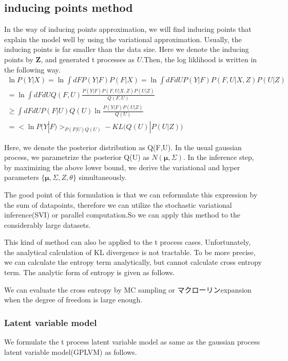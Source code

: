 \documentclass{article}
\begin{document}
 \subsection{inducing points method}

In the way of inducing points approximation, we will find inducing points that explain the model well by using the variational approximation. Usually, the inducing points is far smaller than the data size. Here we denote the inducing points by $\bm{Z}$, and generated t processes as $U$.Then, the log liklihood is written in the following way.
\begin{eqnarray}
\ln {P(Y|X)}=\ln {\int dF P(Y|F)P(F|X)}=\ln {\int dFdU P(Y|F)P(F,U|X,Z)P(U|Z)}\\
=\ln \int dFdU Q(F,U)\frac{P(Y|F)P(F,U|X,Z)P(U|Z)}{Q(F,U)}\\
\geq \int dFdU P(F|U)Q(U)\ln \frac{P(Y|F)P(U|Z)}{Q(U)}\\
= \bigl<\ln P(Y|F) \bigr>_{P(F|U)Q(U)}-KL\bigl(Q(U)|P(U|Z)\bigr)
\end{eqnarray}

Here, we denote the posterior distribution as Q(F,U). In the usual gaussian process, we parametrize the posterior Q(U) as $N(\bm{\mu},\Sigma)$. In the inference step, by maximizing the above lower bound, we derive the variational and hyper parameters $\{\bm{\mu},\Sigma, Z, \theta \}$ simultaneously.

The good point of this formulation is that we can reformulate this expression by the sum of datapoints, therefore we can utilize the stochastic variational inference(SVI) or parallel computation.So we can apply this method to the considerably large datasets.

This kind of method can also be applied to the t process cases. Unfortunately, the analytical calculation of KL divergence is not tractable. To be more precise, we can calculate the entropy term analytically, but cannot calculate cross entropy term. The analytic form of entropy is given as follows.

We can evaluate the cross entropy by MC sampling or マクローリンexpansion when the degree of freedom is  large
enough.

\subsubsection{Latent variable model}
We formulate the t process latent variable model as same as the gaussian process latent variable model(GPLVM) as follows.
\end{document}
